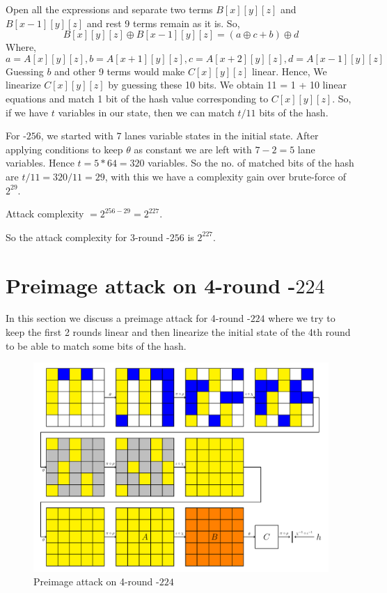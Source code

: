 Open all the expressions and separate two terms $B[x][y][z]$ and $B[x-1][y][z]$ and rest 9 terms remain as it is.
So, \[ B[x][y][z] \oplus B[x-1][y][z] = (a \oplus c + b) \oplus d
    \]
Where,
\[
    a = A[x][y][z], b = A[x + 1][y][z], c = A[x + 2][y][z], d = A[x - 1][y][z]
\]
Guessing $b$ and other 9 terms would make $C[x][y][z]$ linear. Hence, We linearize $C[x][y][z]$ by guessing these 10 bits. We obtain 11 = 1 + 10 linear equations and match 1 bit of the hash value corresponding to $C[x][y][z]$. So, if we have $t$ variables in our state, then we can match $t/11$ bits of the hash.

For \Keccak-$256$, we started with $7$ lanes variable states in the initial state. After applying conditions to keep $\theta$ as constant we are left with $7 - 2 = 5$ lane variables. Hence $t = 5*64 = 320$ variables.
So the no. of matched bits of the hash are $t/11 = 320/11 = 29$, with this we have a complexity gain over brute-force of $2^{29}$.

Attack complexity $ = 2^{256 - 29} = 2^{227}$.

So the attack complexity for 3-round \KECCAK{}-$256$ is $2^{227}$.

\section{Preimage attack on 4-round \KECCAK-$224$}
    
In this section we discuss a preimage attack for 4-round \KECCAK{}-$224$ where we try to keep the first 2 rounds linear and then linearize the initial state of the 4th round to be able to match some bits of the hash.
\begin{figure}[H]
    \includegraphics[scale=0.72]{4R,Keccak-224.pdf}
    \caption{Preimage attack on 4-round \KECCAK-$224$}
    \label{fig:keccak224}
\end{figure}

